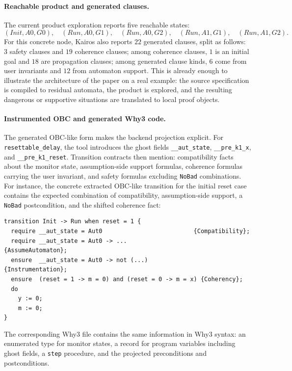 \documentclass[11pt,a4paper]{article}
\begin{document}
\paragraph{Reachable product and generated clauses.}
The current product exploration reports five reachable states:
\[
(Init,A0,G0),\quad
(Run,A0,G1),\quad
(Run,A0,G2),\quad
(Run,A1,G1),\quad
(Run,A1,G2).
\]
For this concrete node, Kairos also reports \(22\) generated clauses, split as
follows: \(3\) safety clauses and \(19\) coherence clauses; among coherence
clauses, \(1\) is an initial goal and \(18\) are propagation clauses; among
generated clause kinds, \(6\) come from user invariants and \(12\) from
automaton support.
This is already enough to illustrate the architecture of the paper on a real
example: the source specification is compiled to residual automata, the product
is explored, and the resulting dangerous or supportive situations are translated
to local proof objects.

\paragraph{Instrumented OBC and generated Why3 code.}
The generated OBC-like form makes the backend projection explicit. For
\texttt{resettable\_delay}, the tool introduces the ghost fields
\texttt{\_\_aut\_state}, \texttt{\_\_pre\_k1\_x}, and
\texttt{\_\_pre\_k1\_reset}. Transition contracts then mention:
compatibility facts about the monitor state, assumption-side support formulas,
coherence formulas carrying the user invariant, and safety formulas excluding
\texttt{NoBad} combinations.
For instance, the concrete extracted OBC-like transition for the initial reset
case contains the expected combination of compatibility, assumption-side
support, a \texttt{NoBad} postcondition, and the shifted coherence fact:
\begin{verbatim}
transition Init -> Run when reset = 1 {
  require __aut_state = Aut0                          {Compatibility};
  require __aut_state = Aut0 -> ...                   {AssumeAutomaton};
  ensure  __aut_state = Aut0 -> not (...)             {Instrumentation};
  ensure  (reset = 1 -> m = 0) and (reset = 0 -> m = x) {Coherency};
  do
    y := 0;
    m := 0;
}
\end{verbatim}
The corresponding Why3 file contains the same information in Why3 syntax: an
enumerated type for monitor states, a record for program variables including
ghost fields, a \texttt{step} procedure, and the projected preconditions and
postconditions.
\end{document}
